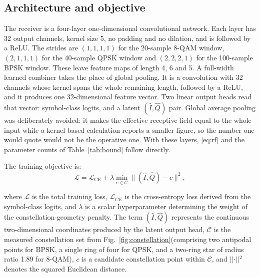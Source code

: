 \documentclass{ieeeaccess}
\begin{document}
\subsection{Architecture and objective}
\label{sec:arch}
The receiver is a four-layer one-dimensional convolutional network. Each layer
has 32 output channels, kernel size 5, no padding and no dilation, and is
followed by a ReLU. The strides are $(1,1,1,1)$ for the 20-sample 8-QAM window,
$(2,1,1,1)$ for the 40-sample QPSK window and $(2,2,2,1)$ for the 100-sample
BPSK window. These leave feature maps of length 4, 6 and 5. A full-width
learned combiner takes the place of global pooling. It is a convolution with 32
channels whose kernel spans the whole remaining length, followed by a ReLU, and
it produces one 32-dimensional feature vector. Two linear output heads read
that vector: symbol-class logits, and a latent $(\hat{I},\hat{Q})$ pair. Global
average pooling was deliberately avoided: it makes the effective receptive field
equal to the whole input while a kernel-based calculation reports a smaller
figure, so the number one would quote would not be the operative one. With
these layers, \eqref{eq:rf} and the parameter counts of Table~\ref{tab:bound}
follow directly.

The training objective is:
\begin{equation}
\mathcal{L} = \mathcal{L}_{\mathrm{CE}}
  + \lambda \min_{c \in \mathcal{C}}
    \big\lVert (\hat{I},\hat{Q}) - c \big\rVert^2 ,
\label{eq:loss}
\end{equation}


where $\mathcal{L}$ is the total training loss, $\mathcal{L}_{CE}$ is the cross-entropy loss derived from the symbol-class logits, and $\lambda$ is a scalar hyperparameter determining the weight of the constellation-geometry penalty. The term $(\hat{I}, \hat{Q})$ represents the continuous two-dimensional coordinates produced by the latent output head, $\mathcal{C}$ is the measured constellation set from  Fig.~\ref{fig:constellation}(comprising two antipodal points for BPSK, a single ring of four for QPSK, and a two-ring star of radius ratio 1.89 for 8-QAM), $c$ is a candidate constellation point within $\mathcal{C}$, and $\vert{}\vert{}\cdot\vert{}\vert{}^2$ denotes the squared Euclidean distance.
\end{document}
